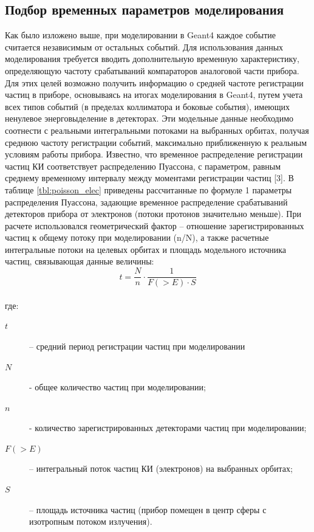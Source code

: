 \subsection{Подбор временных параметров моделирования}\label{puasson}

Как было изложено выше, при моделировании в Geant4 каждое событие считается независимым от остальных событий. Для использования данных моделирования требуется вводить дополнительную временную характеристику, определяющую частоту срабатываний компараторов аналоговой части прибора. Для этих целей возможно получить информацию о средней частоте регистрации частиц в приборе, основываясь на итогах моделирования в Geant4, путем учета всех типов событий (в пределах коллиматора и боковые события), имеющих ненулевое энерговыделение в детекторах. Эти модельные данные необходимо соотнести с реальными интегральными потоками на выбранных орбитах, получая среднюю частоту регистрации событий, максимально приближенную к реальным условиям работы прибора.
Известно, что временное распределение регистрации частиц КИ соответствует распределению Пуассона, с параметром, равным среднему временному интервалу между моментами регистрации частиц [3].
В таблице \ref{tbl:poisson_elec} приведены рассчитанные по формуле 1 параметры распределения Пуассона, задающие временное распределение срабатываний детекторов прибора от электронов (потоки протонов значительно меньше). При расчете использовался геометрический фактор – отношение зарегистрированных частиц к общему потоку при моделировании (n/N), а также расчетные интегральные потоки на целевых орбитах и площадь модельного источника частиц, связывающая данные величины:
\begin{equation}
t= \frac{N}{n} \cdot \frac{1}{F(>E)\cdot S}
\end{equation}
\\где:
\begin{description}
	\item[$ t $] – средний период регистрации частиц при моделировании

	\item[$ N $] - общее количество частиц при моделировании;

	\item[$ n $] - количество зарегистрированных детекторами частиц при моделировании;

	\item[$ F(>E) $] – интегральный поток частиц КИ (электронов) на выбранных орбитах;

	\item[$ S  $]– площадь источника частиц (прибор помещен в центр сферы с изотропным потоком излучения). 
\end{description} 

